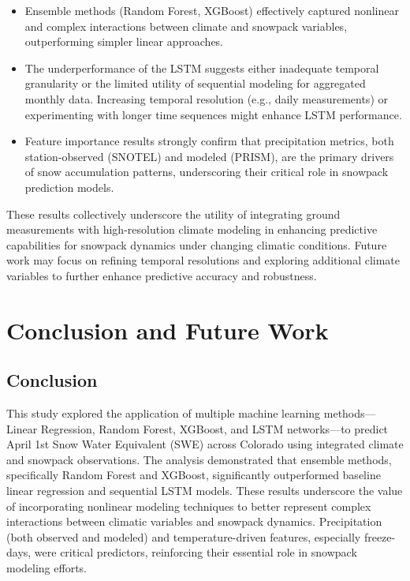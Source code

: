 \documentclass{article}
\begin{document}
\begin{itemize}
    \item Ensemble methods (Random Forest, XGBoost) effectively captured nonlinear and complex interactions between climate and snowpack variables, outperforming simpler linear approaches.
    \item The underperformance of the LSTM suggests either inadequate temporal granularity or the limited utility of sequential modeling for aggregated monthly data. Increasing temporal resolution (e.g., daily measurements) or experimenting with longer time sequences might enhance LSTM performance.
    \item Feature importance results strongly confirm that precipitation metrics, both station-observed (SNOTEL) and modeled (PRISM), are the primary drivers of snow accumulation patterns, underscoring their critical role in snowpack prediction models.
\end{itemize}

These results collectively underscore the utility of integrating ground measurements with high-resolution climate modeling in enhancing predictive capabilities for snowpack dynamics under changing climatic conditions. Future work may focus on refining temporal resolutions and exploring additional climate variables to further enhance predictive accuracy and robustness.

\section{Conclusion and Future Work}

\subsection{Conclusion}
This study explored the application of multiple machine learning methods—Linear Regression, Random Forest, XGBoost, and LSTM networks—to predict April 1st Snow Water Equivalent (SWE) across Colorado using integrated climate and snowpack observations. The analysis demonstrated that ensemble methods, specifically Random Forest and XGBoost, significantly outperformed baseline linear regression and sequential LSTM models. These results underscore the value of incorporating nonlinear modeling techniques to better represent complex interactions between climatic variables and snowpack dynamics. Precipitation (both observed and modeled) and temperature-driven features, especially freeze-days, were critical predictors, reinforcing their essential role in snowpack modeling efforts.
\end{document}
